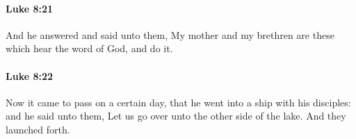 		\paragraph{Luke 8:21} %
			\label{LUKE-8-21}

			And he answered and said unto them, My mother and my brethren are these which hear the word of God, and do it.

			\begin{framed}
			\scriptsize
				\begin{compactdesc}
					\item[SBLG] 
				\end{compactdesc}
			\end{framed}

		\paragraph{Luke 8:22} %
			\label{LUKE-8-22}

			Now it came to pass on a certain day, that he went into a ship with his disciples: and he said unto them, Let us go over unto the other side of the lake. And they launched forth.

